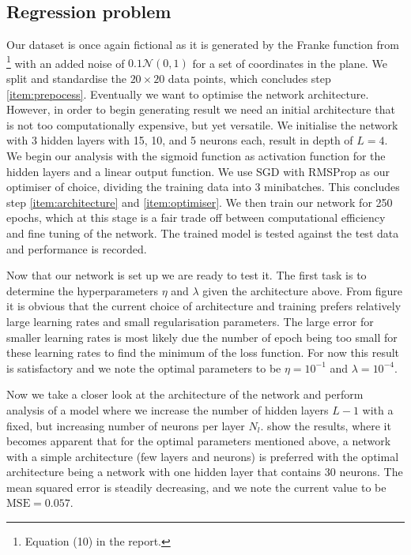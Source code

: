 \subsection{Regression problem}\label{sec:analysis_regression}


    Our dataset is once again fictional as it is generated by the Franke function from \projectOne\footnote{Equation (10) in the report.} with an added noise of $0.1 \mathcal{N}(0, 1)$ for a set of coordinates in the plane. We split and standardise the $20\times 20$ data points, which concludes step \ref{item:prepocess}. 
    Eventually we want to optimise the network architecture. However, in order to begin generating result we need an initial architecture that is not too computationally expensive, but yet versatile. We initialise the network with 3 hidden layers with 15, 10, and 5 neurons each, result in depth of $L=4$. We begin our analysis with the sigmoid function as activation function for the hidden layers and a linear output function. We use SGD with RMSProp as our optimiser of choice, dividing the training data into 3 minibatches. This concludes step \ref{item:architecture} and \ref{item:optimiser}.
    We then train our network for 250 epochs, which at this stage is a fair trade off between computational efficiency and fine tuning of the network. The trained model is tested against the test data and performance is recorded. 

    Now that our network is set up we are ready to test it. The first task is to determine the hyperparameters $\eta$ and $\lambda$ given the architecture above. From figure  it is obvious that the current choice of architecture and training prefers relatively large learning rates and small regularisation parameters. The large error for smaller learning rates is most likely due the number of epoch being too small for these learning rates to find the minimum of the loss function. For now this result is satisfactory and we note the optimal parameters to be $\eta=10^{-1}$ and $\lambda=10^{-4}$. 

    Now we take a closer look at the architecture of the network and perform analysis of a model where we increase the number of hidden layers $L-1$ with a fixed, but increasing number of neurons per layer $N_l$.  show the results, where it becomes apparent that for the optimal parameters mentioned above, a network with a simple architecture (few layers and neurons) is preferred with the optimal architecture being a network with one hidden layer that contains 30 neurons. The mean squared error is steadily decreasing, and we note the current value to be $\mathrm{MSE} = 0.057$. 


